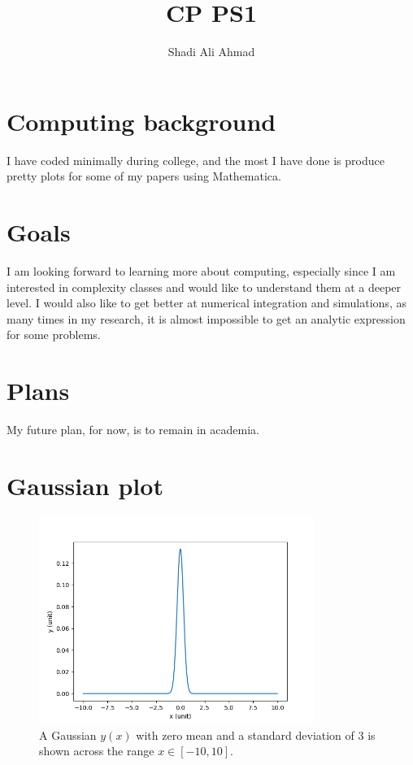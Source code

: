 \documentclass[11pt]{article}
\title{CP PS1}
\author{Shadi Ali Ahmad}
\begin{document}
\maketitle


\section{Computing background}
\label{sec:bg}
I have coded minimally during college, and the most I have done is produce pretty plots for some of my papers using Mathematica.

\section{Goals}
\label{sec:gl}

 I am looking forward to learning more about computing, especially since I am interested in complexity classes and would like to understand them at a deeper level. I would also like to get better at numerical integration and simulations, as many times in my research, it is almost impossible to get an analytic expression for some problems.

\section{Plans}
My future plan, for now, is to remain in academia. 
\section{Gaussian plot}
\begin{figure}[h!]
\centering
\includegraphics[width=0.8\textwidth]{gaussian.png}
\caption{ \label{fig:example} A Gaussian $y(x)$ with zero mean and a standard deviation of $3$ is shown across the range $x\in [-10,10]$. }
\end{figure}





\end{document}
